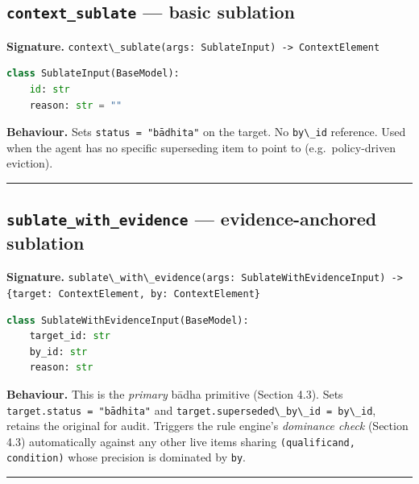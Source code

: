 \subsection{\texorpdfstring{\texttt{context\_sublate} --- basic sublation}{context\_sublate --- basic sublation}}\label{context_sublate-basic-sublation}

\textbf{Signature.} \passthrough{\lstinline!context\_sublate(args: SublateInput) -> ContextElement!}

\begin{lstlisting}[language=Python]
class SublateInput(BaseModel):
    id: str
    reason: str = ""
\end{lstlisting}

\textbf{Behaviour.} Sets \passthrough{\lstinline!status = "bādhita"!} on the target. No \passthrough{\lstinline!by\_id!} reference. Used when the agent has no specific superseding item to point to (e.g.~policy-driven eviction).

\begin{center}\rule{0.5\linewidth}{0.5pt}\end{center}

\subsection{\texorpdfstring{\texttt{sublate\_with\_evidence} --- evidence-anchored sublation}{sublate\_with\_evidence --- evidence-anchored sublation}}\label{sublate_with_evidence-evidence-anchored-sublation}

\textbf{Signature.} \passthrough{\lstinline!sublate\_with\_evidence(args: SublateWithEvidenceInput) -> \{target: ContextElement, by: ContextElement\}!}

\begin{lstlisting}[language=Python]
class SublateWithEvidenceInput(BaseModel):
    target_id: str
    by_id: str
    reason: str
\end{lstlisting}

\textbf{Behaviour.} This is the \emph{primary} bādha primitive (Section 4.3). Sets \passthrough{\lstinline!target.status = "bādhita"!} and \passthrough{\lstinline!target.superseded\_by\_id = by\_id!}, retains the original for audit. Triggers the rule engine's \emph{dominance check} (Section 4.3) automatically against any other live items sharing \passthrough{\lstinline!(qualificand, condition)!} whose precision is dominated by \passthrough{\lstinline!by!}.

\begin{center}\rule{0.5\linewidth}{0.5pt}\end{center}

